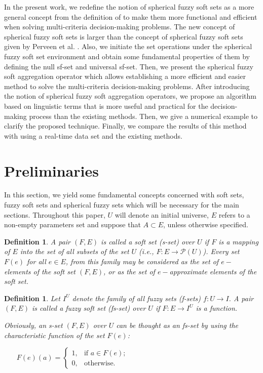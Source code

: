 \documentclass{IJFS}
\newtheorem{definition}[theorem]{Definition}
\begin{document}
In the present work, we redefine the notion of spherical fuzzy soft sets as a more general concept from the definition of \cite{per} to make them more functional and efficient when solving multi-criteria decision-making problems. The new concept of spherical fuzzy soft sets is larger than the concept of spherical fuzzy soft sets given by Perveen et al. \cite{per}. Also, we initiate the set operations under the spherical fuzzy soft set environment and obtain some fundamental properties of them by defining the null sf-set and universal sf-set. Then, we present the spherical fuzzy soft aggregation operator which allows establishing a more efficient and easier method to solve the multi-criteria decision-making problems. After introducing the notion of spherical fuzzy soft aggregation operators, we propose an algorithm based on linguistic terms that is more useful and practical for the decision-making process than the existing methods. Then, we give a numerical example to clarify the proposed technique. Finally, we compare the results of this method with using a real-time data set and the existing methods.



\section{Preliminaries}
In this section, we yield some fundamental concepts concerned with
soft sets, fuzzy soft sets and spherical fuzzy sets which will be
necessary for the main sections. Throughout this paper, $U$ will
denote an initial universe, $E$ refers to a non-empty parameters
set and suppose that $A \subset E$, unless otherwise specified.


\begin{definition} \cite{mol} A pair $(F,E)$ is called a soft
set (s-set) over $U$ if  $F$ is a mapping of $E$ into the set of all
subsets of the set $U$ (i.e., $F:E\rightarrow \mathscr{P}(U)$).  Every set $F(e)$ for all
$e\in E$, from this family may be considered as the set
of $e-$elements of the soft set $(F,E)$, or as the set
of $e-$approximate elements of the soft set.

\end{definition}

\begin{definition} \cite{maj} Let $I^U$ denote the  family of all fuzzy sets (f-sets) $f:U\to I$. A pair $(F, E)$ is called a fuzzy soft set (fs-set) over $U$ if $F: E\to I^U$ is a function.

Obviously, an  s-set $(F,E)$ over $U$ can be thought as an fs-set by
using the characteristic function of the set $F(e)$:
\begin{center}
    $~~~~~~~~\displaystyle F(e)(a)=
\begin{cases}
\displaystyle 1, &\text{if $a\in F(e)$;}\\
0, &\text{otherwise.}
\end{cases}$
\end{center}

\end{definition}
\end{document}
